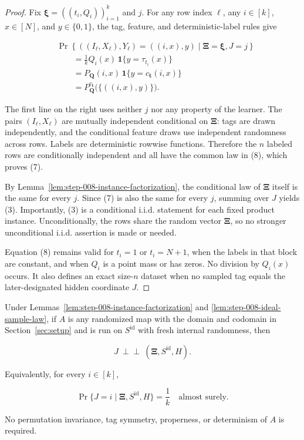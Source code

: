 \begin{proof}
Fix \(\boldsymbol\xi=((t_i,Q_i))_{i=1}^k\) and \(j\). For any row index
\(\ell\), any \(i\in[k]\), \(x\in[N]\), and \(y\in\{0,1\}\), the tag,
feature, and deterministic-label rules give

\[
\begin{aligned}
&\Pr\left\{((I_\ell,X_\ell),Y_\ell)=((i,x),y)
  \mid\boldsymbol\Xi=\boldsymbol\xi,J=j\right\}\\
&\qquad=\frac1k Q_i(x)\,
  \mathbf1\{y=\tau_{t_i}(x)\}\\
&\qquad=P_{\boldsymbol Q}(i,x)\,
  \mathbf1\{y=c_{\boldsymbol t}(i,x)\}\\
&\qquad=P_{\boldsymbol Q}^{c_{\boldsymbol t}}
  \bigl(\{((i,x),y)\}\bigr).
\end{aligned}
\tag{8}
\]

The first line on the right uses neither \(j\) nor any property of the
learner. The pairs \((I_\ell,X_\ell)\) are mutually independent conditional
on \(\boldsymbol\Xi\): tags are drawn independently, and the conditional
feature draws use independent randomness across rows. Labels are
deterministic rowwise functions. Therefore the \(n\) labeled rows are
conditionally independent and all have the common law in (8), which proves
(7).

By Lemma~\ref{lem:step-008-instance-factorization}, the conditional law of
\(\boldsymbol\Xi\) itself is the same for every \(j\). Since (7) is also the
same for every \(j\), summing over \(J\) yields (3). Importantly, (3) is a
conditional i.i.d. statement for each fixed product instance. Unconditionally,
the rows share the random vector \(\boldsymbol\Xi\), so no stronger
unconditional i.i.d. assertion is made or needed.

Equation (8) remains valid for \(t_i=1\) or \(t_i=N+1\), when the labels in
that block are constant, and when \(Q_i\) is a point mass or has zeros. No
division by \(Q_i(x)\) occurs. It also defines an exact size-\(n\) dataset
when no sampled tag equals the later-designated hidden coordinate \(J\).
\end{proof}

\begin{lemma}\label{lem:step-008-selector-independence}
Under Lemmas~\ref{lem:step-008-instance-factorization} and
\ref{lem:step-008-ideal-sample-law}, if \(A\) is any randomized map with the
domain and codomain in Section~\ref{sec:setup} and is run on
\(S^{\mathrm{id}}\) with fresh internal randomness, then

\[
J\ \perp\!\!\!\perp\
(\boldsymbol\Xi,S^{\mathrm{id}},H).
\tag{9}
\]

Equivalently, for every \(i\in[k]\),

\[
\Pr\{J=i\mid\boldsymbol\Xi,S^{\mathrm{id}},H\}=\frac1k
\quad\text{almost surely}.
\tag{10}
\]

No permutation invariance, tag symmetry, properness, or determinism of
\(A\) is required.
\end{lemma}

